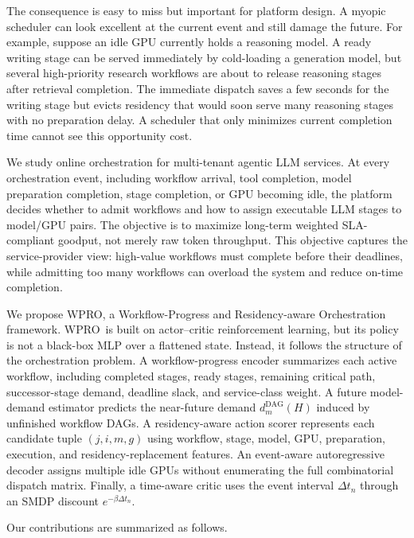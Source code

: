 \documentclass[10pt,conference]{IEEEtran}
\newcommand{\WPRO}{\textsc{WPRO}}
\begin{document}
The consequence is easy to miss but important for platform design. A myopic scheduler can look excellent at the current event and still damage the future. For example, suppose an idle GPU currently holds a reasoning model. A ready writing stage can be served immediately by cold-loading a generation model, but several high-priority research workflows are about to release reasoning stages after retrieval completion. The immediate dispatch saves a few seconds for the writing stage but evicts residency that would soon serve many reasoning stages with no preparation delay. A scheduler that only minimizes current completion time cannot see this opportunity cost.

We study online orchestration for multi-tenant agentic LLM services. At every orchestration event, including workflow arrival, tool completion, model preparation completion, stage completion, or GPU becoming idle, the platform decides whether to admit workflows and how to assign executable LLM stages to model/GPU pairs. The objective is to maximize long-term weighted SLA-compliant goodput, not merely raw token throughput. This objective captures the service-provider view: high-value workflows must complete before their deadlines, while admitting too many workflows can overload the system and reduce on-time completion.

We propose \WPRO, a Workflow-Progress and Residency-aware Orchestration framework. \WPRO\ is built on actor--critic reinforcement learning, but its policy is not a black-box MLP over a flattened state. Instead, it follows the structure of the orchestration problem. A workflow-progress encoder summarizes each active workflow, including completed stages, ready stages, remaining critical path, successor-stage demand, deadline slack, and service-class weight. A future model-demand estimator predicts the near-future demand \(d_m^{\mathrm{DAG}}(H)\) induced by unfinished workflow DAGs. A residency-aware action scorer represents each candidate tuple \((j,i,m,g)\) using workflow, stage, model, GPU, preparation, execution, and residency-replacement features. An event-aware autoregressive decoder assigns multiple idle GPUs without enumerating the full combinatorial dispatch matrix. Finally, a time-aware critic uses the event interval \(\Delta t_n\) through an SMDP discount \(e^{-\beta \Delta t_n}\).

Our contributions are summarized as follows.
\end{document}

